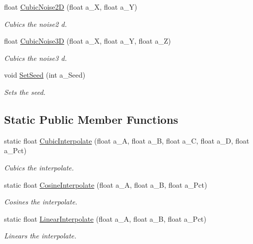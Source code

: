 \begin{DoxyCompactItemize}
float \hyperlink{classc_noise_a08a8796a5bea2465cd67957313d770eb}{Cubic\+Noise2D} (float a\+\_\+X, float a\+\_\+Y)
\begin{DoxyCompactList}\small\item\em Cubics the noise2 d. \end{DoxyCompactList}\item 
float \hyperlink{classc_noise_af570557a7a32b66b8ecd9a7733d8d0bf}{Cubic\+Noise3D} (float a\+\_\+X, float a\+\_\+Y, float a\+\_\+Z)
\begin{DoxyCompactList}\small\item\em Cubics the noise3 d. \end{DoxyCompactList}\item 
void \hyperlink{classc_noise_a11e29092b7f84b68dce9dc2a1c951e8b}{Set\+Seed} (int a\+\_\+\+Seed)
\begin{DoxyCompactList}\small\item\em Sets the seed. \end{DoxyCompactList}\end{DoxyCompactItemize}
\subsection*{Static Public Member Functions}
\begin{DoxyCompactItemize}
\item 
static float \hyperlink{classc_noise_a9624304fdaa79f7e9f74d72441974404}{Cubic\+Interpolate} (float a\+\_\+A, float a\+\_\+B, float a\+\_\+C, float a\+\_\+D, float a\+\_\+\+Pct)
\begin{DoxyCompactList}\small\item\em Cubics the interpolate. \end{DoxyCompactList}\item 
static float \hyperlink{classc_noise_a5df3de6b8f68a6937ec971c352edbd89}{Cosine\+Interpolate} (float a\+\_\+A, float a\+\_\+B, float a\+\_\+\+Pct)
\begin{DoxyCompactList}\small\item\em Cosines the interpolate. \end{DoxyCompactList}\item 
static float \hyperlink{classc_noise_aa3e800efc296cdce2ab8efad8bdbb4c0}{Linear\+Interpolate} (float a\+\_\+A, float a\+\_\+B, float a\+\_\+\+Pct)
\begin{DoxyCompactList}\small\item\em Linears the interpolate. \end{DoxyCompactList}\end{DoxyCompactItemize}


